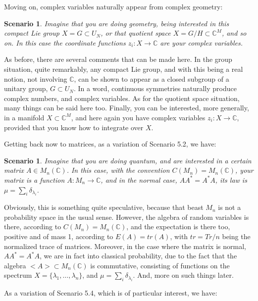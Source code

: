\documentclass[12pt]{amsbook}
\newtheorem{scenario}[theorem]{Scenario}
\begin{document}
\bigskip

Moving on, complex variables naturally appear from complex geometry:

\begin{scenario}
Imagine that you are doing geometry, being interested in this compact Lie group $X=G\subset U_N$, or that quotient space $X=G/H\subset\mathbb C^M$, and so on. In this case the coordinate functions $z_i:X\to\mathbb C$ are your complex variables.
\end{scenario}

As before, there are several comments that can be made here. In the group situation, quite remarkably, any compact Lie group, and with this being a real notion, not involving $\mathbb C$, can be shown to appear as a closed subgroup of a unitary group, $G\subset U_N$. In a word, continuous symmetries naturally produce complex numbers, and complex variables. As for the quotient space situation, many things can be said here too. Finally, you can be interested, more generally, in a manifold $X\subset\mathbb C^M$, and here again you have complex variables $z_i:X\to\mathbb C$, provided that you know how to integrate over $X$.

\bigskip

Getting back now to matrices, as a variation of Scenario 5.2, we have:

\begin{scenario}
Imagine that you are doing quantum, and are interested in a certain matrix $A\in M_n(\mathbb C)$. In this case, with the convention $C(M_n)=M_n(\mathbb C)$, your matrix is a function $A:M_n\to\mathbb C$, and in the normal case, $AA^*=A^*A$, its law is $\mu=\sum_i\delta_{\lambda_i}$.
\end{scenario}

Obviously, this is something quite speculative, because that beast $M_n$ is not a probability space in the usual sense. However, the algebra of random variables is there, according to $C(M_n)=M_n(\mathbb C)$, and the expectation is there too, positive and of mass 1, according to $E(A)=tr(A)$, with $tr=Tr/n$ being the normalized trace of matrices. Moreover, in the case where the matrix is normal, $AA^*=A^*A$, we are in fact into classical probability, due to the fact that the algebra $<A>\subset M_n(\mathbb C)$ is commutative, consisting of functions on the spectrum $X=\{\lambda_1,\ldots,\lambda_n\}$, and $\mu=\sum_i\delta_{\lambda_i}$. And, more on such things later.

\bigskip

As a variation of Scenario 5.4, which is of particular interest, we have:
\end{document}
